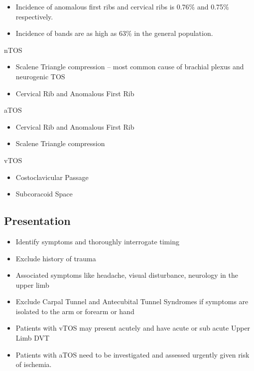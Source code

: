 \documentclass[
]{book}
\begin{document}
\begin{itemize}
\item
  Incidence of anomalous first ribs and cervical ribs is 0.76\% and
  0.75\% respectively.
\item
  Incidence of bands are as high as 63\% in the general population.
  \citep{humphries124ThoracicOutlet2019}
\end{itemize}

nTOS

\begin{itemize}
\item
  Scalene Triangle compression -- most common cause of brachial plexus
  and neurogenic TOS
\item
  Cervical Rib and Anomalous First Rib
\end{itemize}

aTOS

\begin{itemize}
\item
  Cervical Rib and Anomalous First Rib
\item
  Scalene Triangle compression
\end{itemize}

vTOS

\begin{itemize}
\item
  Costoclavicular Passage
\item
  Subcoracoid Space
\end{itemize}

\hypertarget{presentation-5}{%
\subsection{Presentation}\label{presentation-5}}

\begin{itemize}
\item
  Identify symptoms and thoroughly interrogate timing
\item
  Exclude history of trauma
\item
  Associated symptoms like headache, visual disturbance, neurology in
  the upper limb
\item
  Exclude Carpal Tunnel and Antecubital Tunnel Syndromes if symptoms
  are isolated to the arm or forearm or hand
\item
  Patients with vTOS may present acutely and have acute or sub acute
  Upper Limb DVT
\item
  Patients with aTOS need to be investigated and assessed urgently
  given risk of ischemia.
\end{itemize}
\end{document}
